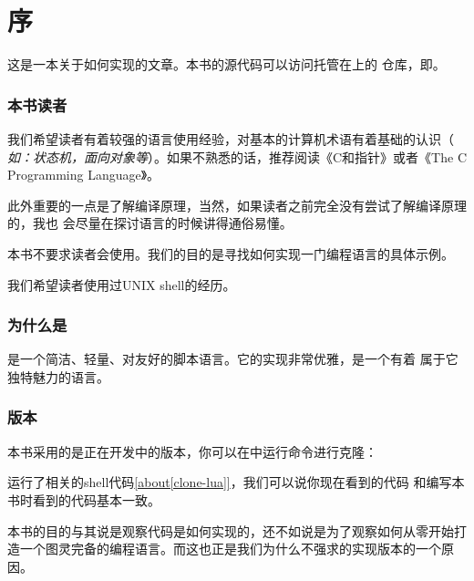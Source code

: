 

\chapter*{序}

这是一本关于如何实现的文章。本书的源代码可以访问托管在上的
仓库，即。

\subsection*{本书读者}

我们希望读者有着较强的语言使用经验，对基本的计算机术语有着基础的认识（\emph{%
如：状态机，面向对象等}）。如果不熟悉的话，推荐阅读《C和指针》或者《The C Programming
Language》。

此外重要的一点是了解编译原理，当然，如果读者之前完全没有尝试了解编译原理的，我也
会尽量在探讨语言的时候讲得通俗易懂。

本书不要求读者会使用。我们的目的是寻找如何实现一门编程语言的具体示例。

我们希望读者使用过UNIX shell的经历。


\subsection*{为什么是}

是一个简洁、轻量、对友好的脚本语言。它的实现非常优雅，是一个有着
属于它独特魅力的语言。


\subsection*{版本}

本书采用的是正在开发中的版本，你可以在中运行命令进行克隆：

\def\useless${}

运行了相关的shell代码\ref{about[clone-lua]}，我们可以说你现在看到的代码
和编写本书时看到的代码基本一致。

本书的目的与其说是观察代码是如何实现的，还不如说是为了观察如何从零开始打
造一个图灵完备的编程语言。而这也正是我们为什么不强求的实现版本的一个原因。



